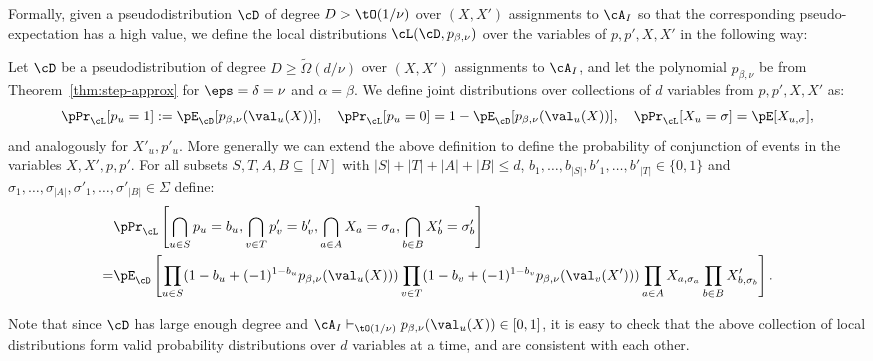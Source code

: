 Formally, given a pseudodistribution $\cD$ of degree $D > \tO(1/\nu)$ over $(X,X')$ assignments to $\cA_I$ so that the corresponding pseudo-expectation has a high value, 
we define the local distributions $\cL(\cD, p_{\beta,\nu})$ over the variables of $p,p', X, X'$ in the following way:
\begin{definition}\label{defn:local-dist}
Let $\cD$ be a pseudodistribution of degree $D\geq \tilde{\Omega}(d/\nu)$ over $(X,X')$ assignments to $\cA_{I}$, and let the polynomial $p_{\beta,\nu}$ be from Theorem~\ref{thm:step-approx} for $\eps=\delta = \nu$ 
and $\alpha = \beta$.
We define joint distributions over collections of $d$ variables from $p,p',X,X'$ as:
\[\pPr_{{\cL}}[p_u = 1] := \pE_{\cD}[p_{\beta,\nu}(\val_u(X))], ~~~ \pPr_{\cL}[p_u = 0] = 1- \pE_{\cD}[p_{\beta,\nu}(\val_u(X))],~~~ \pPr_{\cL}[X_u = \sigma] = \pE[X_{u,\sigma}],\]
and analogously for $X'_u,p'_u$. More generally we can extend the above definition to define the probability of conjunction of events in the variables $X,X',p,p'$. For all subsets $S,T,A,B \subseteq [N]$ with $|S|+|T|+|A|+|B| \leq d$, $b_1,\ldots,b_{|S|},b'_1,\ldots,b'_{|T|} \in \{0,1\}$ and $\sigma_1,\ldots,\sigma_{|A|},\sigma'_1,\ldots,\sigma'_{|B|} \in \Sigma$ define:
\begin{align*}
&\pPr_{{\cL}}\left[\bigcap_{u \in S} p_u = b_u, \bigcap_{v \in T} p'_v = b'_v, \bigcap_{a \in A} X_{a} = \sigma_a,\bigcap_{b \in B} X'_{b} = \sigma'_b\right] \\= &\pE_{\cD}\left[\prod_{u \in S} (1-b_u + (-1)^{1-b_u}p_{\beta,\nu}(\val_u(X))) \prod_{v \in T} (1-b_v + (-1)^{1-b_v}p_{\beta,\nu}(\val_v(X'))) \prod_{a \in A}X_{a,\sigma_a} \prod_{b \in B}X'_{b,\sigma_b}\right].
\end{align*}
\end{definition}
\begin{remark}
Note that since $\cD$ has large enough degree and $\cA_I \vdash_{\tO(1/\nu)} p_{\beta,\nu}(\val_u(X)) \in [0,1]$, it is easy to check that the above collection of local distributions form valid probability distributions over $d$ variables at a time, and are consistent with each other.
\end{remark}

